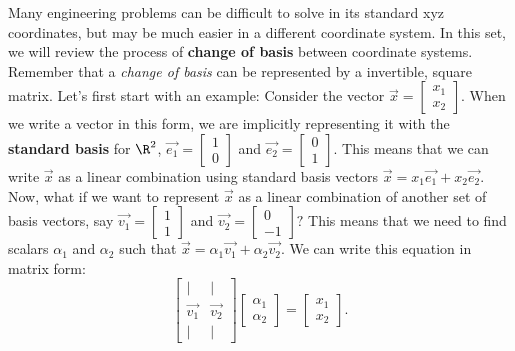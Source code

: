 

Many engineering problems can be difficult to solve in its standard xyz coordinates, but may be much easier in a different coordinate system.
In this set, we will review the process of \textbf{change of basis} between coordinate systems.
Remember that a \emph{change of basis} can be represented by a invertible, square matrix. \vskip 1pt
Let's first start with an example:
Consider the vector $\vec{x} = \begin{bmatrix} x_1 \\ x_2 \end{bmatrix}.$ 
When we write a vector in this form, we are implicitly representing it with the \textbf{standard basis} for $\R^{2}$, $\vec{e_1} = \begin{bmatrix} 1 \\ 0 \end{bmatrix}$ and $\vec{e_2} = \begin{bmatrix} 0 \\ 1 \end{bmatrix}.$ \vspace{1em} 
This means that we can write $\vec{x}$ as a linear combination using standard basis vectors $\vec{x} = x_1\vec{e_1} + x_2\vec{e_2}$. \vspace {1em} 
Now, what if we want to represent $\vec{x}$ as a linear combination of another set of basis vectors, say $\vec{v_1} = \begin{bmatrix} 1 \\ 1 \end{bmatrix}$ and $\vec{v_2} = \begin{bmatrix} 0 \\ -1 \end{bmatrix}?$ \vskip 1pt
This means that we need to find scalars $\alpha_{1}$ and $\alpha_{2}$ such that $\vec{x} = \alpha_1 \vec{v_1} + \alpha_2 \vec{v_2}$.
We can write this equation in matrix form:
\[
  \begin{bmatrix}
    | & | \\
    \vec{v_1} & \vec{v_2} \\
    | & |
  \end{bmatrix}
  \begin{bmatrix} \alpha_1 \\ \alpha_2 \end{bmatrix} = \begin{bmatrix} x_1 \\ x_2 \end{bmatrix}
.\]

